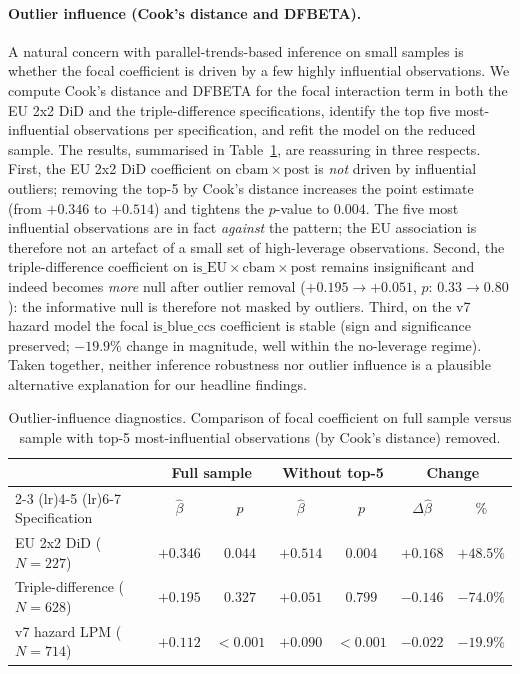 \documentclass[11pt,a4paper]{article}
\begin{document}
\paragraph{Outlier influence (Cook's distance and DFBETA).} A natural concern with parallel-trends-based inference on small samples is whether the focal coefficient is driven by a few highly influential observations. We compute Cook's distance and DFBETA for the focal interaction term in both the EU 2x2 DiD and the triple-difference specifications, identify the top five most-influential observations per specification, and refit the model on the reduced sample. The results, summarised in Table~\ref{tab:ch8-outlier}, are reassuring in three respects. First, the EU 2x2 DiD coefficient on $\mathrm{cbam}\times \mathrm{post}$ is \emph{not} driven by influential outliers; removing the top-5 by Cook's distance increases the point estimate (from $+0.346$ to $+0.514$) and tightens the $p$-value to $0.004$. The five most influential observations are in fact \emph{against} the pattern; the EU association is therefore not an artefact of a small set of high-leverage observations. Second, the triple-difference coefficient on $\mathrm{is\_EU}\times \mathrm{cbam}\times \mathrm{post}$ remains insignificant and indeed becomes \emph{more} null after outlier removal ($+0.195 \to +0.051$, $p$: $0.33 \to 0.80$): the informative null is therefore not masked by outliers. Third, on the v7 hazard model the focal $\mathrm{is\_blue\_ccs}$ coefficient is stable (sign and significance preserved; $-19.9\%$ change in magnitude, well within the no-leverage regime). Taken together, neither inference robustness nor outlier influence is a plausible alternative explanation for our headline findings.

\begin{table}[ht]
\centering
\caption{Outlier-influence diagnostics. Comparison of focal coefficient on full sample versus sample with top-5 most-influential observations (by Cook's distance) removed.}
\label{tab:ch8-outlier}
\begin{tabular}{lcccccc}
\toprule
& \multicolumn{2}{c}{Full sample} & \multicolumn{2}{c}{Without top-5} & \multicolumn{2}{c}{Change} \\
\cmidrule(lr){2-3} \cmidrule(lr){4-5} \cmidrule(lr){6-7}
Specification & $\hat\beta$ & $p$ & $\hat\beta$ & $p$ & $\Delta\hat\beta$ & \% \\
\midrule
EU 2x2 DiD ($N = 227$)         & $+0.346$ & $0.044$ & $+0.514$ & $0.004$ & $+0.168$ & $+48.5\%$ \\
Triple-difference ($N = 628$)  & $+0.195$ & $0.327$ & $+0.051$ & $0.799$ & $-0.146$ & $-74.0\%$ \\
v7 hazard LPM ($N = 714$)      & $+0.112$ & $<0.001$ & $+0.090$ & $<0.001$ & $-0.022$ & $-19.9\%$ \\
\bottomrule
\end{tabular}
\end{table}
\end{document}
